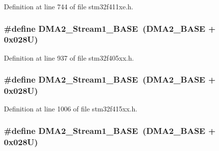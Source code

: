Definition at line 744 of file stm32f411xe.\+h.

\subsubsection[{\texorpdfstring{D\+M\+A2\+\_\+\+Stream1\+\_\+\+B\+A\+SE}{DMA2_Stream1_BASE}}]{\setlength{\rightskip}{0pt plus 5cm}\#define D\+M\+A2\+\_\+\+Stream1\+\_\+\+B\+A\+SE~({\bf D\+M\+A2\+\_\+\+B\+A\+SE} + 0x028\+U)}\hypertarget{group___peripheral__registers__structures_ga35512bdc3f5e9df4557c2fbe7935d0b1}{}\label{group___peripheral__registers__structures_ga35512bdc3f5e9df4557c2fbe7935d0b1}


Definition at line 937 of file stm32f405xx.\+h.

\subsubsection[{\texorpdfstring{D\+M\+A2\+\_\+\+Stream1\+\_\+\+B\+A\+SE}{DMA2_Stream1_BASE}}]{\setlength{\rightskip}{0pt plus 5cm}\#define D\+M\+A2\+\_\+\+Stream1\+\_\+\+B\+A\+SE~({\bf D\+M\+A2\+\_\+\+B\+A\+SE} + 0x028\+U)}\hypertarget{group___peripheral__registers__structures_ga35512bdc3f5e9df4557c2fbe7935d0b1}{}\label{group___peripheral__registers__structures_ga35512bdc3f5e9df4557c2fbe7935d0b1}


Definition at line 1006 of file stm32f415xx.\+h.

\subsubsection[{\texorpdfstring{D\+M\+A2\+\_\+\+Stream1\+\_\+\+B\+A\+SE}{DMA2_Stream1_BASE}}]{\setlength{\rightskip}{0pt plus 5cm}\#define D\+M\+A2\+\_\+\+Stream1\+\_\+\+B\+A\+SE~({\bf D\+M\+A2\+\_\+\+B\+A\+SE} + 0x028\+U)}\hypertarget{group___peripheral__registers__structures_ga35512bdc3f5e9df4557c2fbe7935d0b1}{}\label{group___peripheral__registers__structures_ga35512bdc3f5e9df4557c2fbe7935d0b1}


